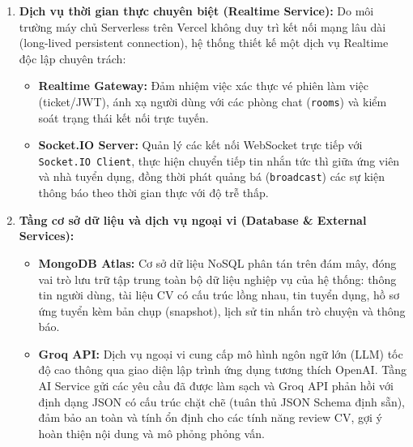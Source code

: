 \begin{enumerate}
\begin{itemize}
        \item \textbf{Tầng mô hình dữ liệu (Model Layer):} Sử dụng Mongoose ODM để định nghĩa lược đồ (Schema) và thao tác đọc/ghi dữ liệu (\texttt{read / write}) với cơ sở dữ liệu MongoDB. Các model chính bao gồm: \texttt{User}, \texttt{Resume}, \texttt{Job}, \texttt{Application}, \texttt{Message}, \texttt{Notification} và \texttt{AiUsage}.
    \end{itemize}

    \item \textbf{Dịch vụ thời gian thực chuyên biệt (Realtime Service):}
    Do môi trường máy chủ Serverless trên Vercel không duy trì kết nối mạng lâu dài (long-lived persistent connection), hệ thống thiết kế một dịch vụ Realtime độc lập chuyên trách:
    \begin{itemize}
        \item \textbf{Realtime Gateway:} Đảm nhiệm việc xác thực vé phiên làm việc (ticket/JWT), ánh xạ người dùng với các phòng chat (\texttt{rooms}) và kiểm soát trạng thái kết nối trực tuyến.
        \item \textbf{Socket.IO Server:} Quản lý các kết nối WebSocket trực tiếp với \texttt{Socket.IO Client}, thực hiện chuyển tiếp tin nhắn tức thì giữa ứng viên và nhà tuyển dụng, đồng thời phát quảng bá (\texttt{broadcast}) các sự kiện thông báo theo thời gian thực với độ trễ thấp.
    \end{itemize}

    \item \textbf{Tầng cơ sở dữ liệu và dịch vụ ngoại vi (Database \& External Services):}
    \begin{itemize}
        \item \textbf{MongoDB Atlas:} Cơ sở dữ liệu NoSQL phân tán trên đám mây, đóng vai trò lưu trữ tập trung toàn bộ dữ liệu nghiệp vụ của hệ thống: thông tin người dùng, tài liệu CV có cấu trúc lồng nhau, tin tuyển dụng, hồ sơ ứng tuyển kèm bản chụp (snapshot), lịch sử tin nhắn trò chuyện và thông báo.
        \item \textbf{Groq API:} Dịch vụ ngoại vi cung cấp mô hình ngôn ngữ lớn (LLM) tốc độ cao thông qua giao diện lập trình ứng dụng tương thích OpenAI. Tầng AI Service gửi các yêu cầu đã được làm sạch và Groq API phản hồi với định dạng JSON có cấu trúc chặt chẽ (tuân thủ JSON Schema định sẵn), đảm bảo an toàn và tính ổn định cho các tính năng review CV, gợi ý hoàn thiện nội dung và mô phỏng phỏng vấn.
    \end{itemize}
\end{enumerate}

